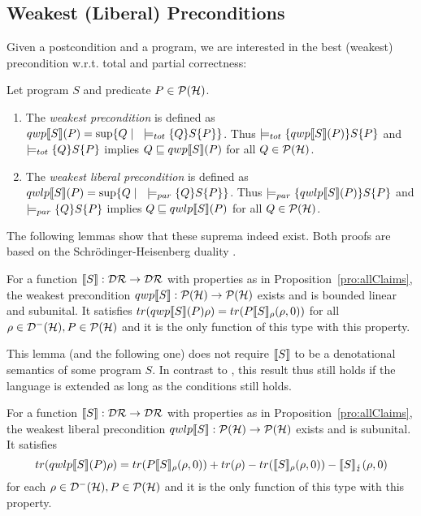 \documentclass[a4paper,UKenglish,cleveref, autoref, thm-restate]{lipics-v2021}
\begin{document}
\subsection{Weakest (Liberal) Preconditions}
Given a postcondition and a program, we are interested in the best (weakest) precondition w.r.t. total and partial correctness:
\begin{definition}
    Let program $S$ and predicate $P \in \mathcal{P}(\mathcal{H})$.
    \begin{enumerate}
        \item The \emph{weakest precondition} is defined as $qwp\llbracket S \rrbracket (P)= \sup \{Q \mid \text{ } \models_{tot} \{Q\} S \{P\}\}$. Thus $\models_{tot}\{qwp\llbracket S \rrbracket (P)\} S \{P\}$ and $\models_{tot}\{Q\} S \{P\}$ implies $Q\sqsubseteq qwp\llbracket S \rrbracket (P)$ for all $Q\in \mathcal{P}(\mathcal{H})$.
        \item The \emph{weakest liberal precondition} is defined as $qwlp\llbracket S \rrbracket (P)= \sup \{Q \mid \text{ }\models_{par} \{Q\} S \{P\}\}$. Thus $\models_{par}\{qwlp\llbracket S \rrbracket (P)\} S \{P\}$ and $\models_{par}\{Q\} S \{P\}$ implies $Q\sqsubseteq qwlp\llbracket S \rrbracket (P)$ for all $Q\in \mathcal{P}(\mathcal{H})$.
    \end{enumerate}
\end{definition}
The following lemmas show that these suprema indeed exist. Both proofs are based on the Schrödinger-Heisenberg duality \cite{heisenbergdualityUnruh}.
\begin{lemma}
    \label{lem:schroedinger}
    For a function $\llbracket S \rrbracket: \mathcal{D}\mathcal{R}\to \mathcal{D}\mathcal{R}$ with properties as in Proposition~\ref{pro:allClaims}, the weakest precondition $qwp\llbracket S \rrbracket: \mathcal{P}(\mathcal{H}) \rightarrow \mathcal{P}(\mathcal{H})$ exists and is bounded linear and subunital. It satisfies $tr(qwp\llbracket S \rrbracket (P)\rho) = tr(P\llbracket S \rrbracket_{\rho}(\rho,0))$ for all $\rho \in \mathcal{D}^- (\mathcal{H}), P \in \mathcal{P}(\mathcal{H})$ and it is the only function of this type with this property.
\end{lemma}
This lemma (and the following one) does not require $\llbracket S \rrbracket$ to be a denotational semantics of some program $S$. In contrast to \cite{floydHoareLogic}, this result thus still holds if the language is extended as long as the conditions still holds.
\begin{lemma} \label{lem:wlpexistence}
    For a function $\llbracket S \rrbracket:\mathcal{D}\mathcal{R} \rightarrow \mathcal{D}\mathcal{R}$ with properties as in Proposition~\ref{pro:allClaims}, the weakest liberal precondition $qwlp\llbracket S \rrbracket: \mathcal{P}(\mathcal{H}) \rightarrow \mathcal{P}(\mathcal{H})$ exists and is subunital. It satisfies
    \begin{equation*}
        tr(qwlp\llbracket S \rrbracket (P)\rho) = tr(P\llbracket S \rrbracket_{\rho}(\rho,0)) + tr(\rho)-tr(\llbracket S \rrbracket_{\rho}(\rho,0))- \llbracket S \rrbracket_{\lightning}(\rho,0)
    \end{equation*}
    for each $\rho \in \mathcal{D}^- (\mathcal{H}), P\in \mathcal{P}(\mathcal{H})$ and it is the only function of this type with this property.
\end{lemma}
\end{document}
